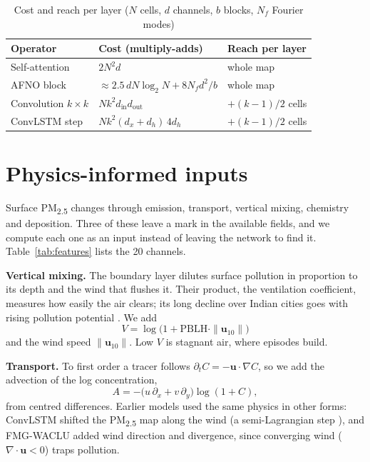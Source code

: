 \documentclass[conference]{IEEEtran}
\newcommand{\PM}{PM\textsubscript{2.5}}
\begin{document}
\begin{table}[!t]
\centering
\caption{Cost and reach per layer ($N$ cells, $d$ channels, $b$ blocks, $N_f$ Fourier modes)}
\label{tab:cost}
\setlength{\tabcolsep}{4pt}
\begin{tabular}{@{}lll@{}}
\toprule
Operator & Cost (multiply-adds) & Reach per layer \\
\midrule
Self-attention & $2N^2d$ & whole map \\
AFNO block & $\approx 2.5\,dN\log_2N + 8N_fd^2/b$ & whole map \\
Convolution $k\times k$ & $Nk^2d_{\text{in}}d_{\text{out}}$ & $+(k-1)/2$ cells \\
ConvLSTM step & $Nk^2(d_x+d_h)\,4d_h$ & $+(k-1)/2$ cells \\
\bottomrule
\end{tabular}
\end{table}

\section{Physics-informed inputs}
\label{sec:physics}
Surface \PM{} changes through emission, transport, vertical mixing, chemistry and deposition. Three of these leave a mark in the available fields, and we compute each one as an input instead of leaving the network to find it. Table~\ref{tab:features} lists the 20 channels.

\textbf{Vertical mixing.} The boundary layer dilutes surface pollution in proportion to its depth and the wind that flushes it. Their product, the ventilation coefficient, measures how easily the air clears; its long decline over Indian cities goes with rising pollution potential \cite{iyer2013}. We add
\begin{equation}
V = \log\bigl(1+\mathrm{PBLH}\cdot\|\mathbf{u}_{10}\|\bigr)
\end{equation}
and the wind speed $\|\mathbf{u}_{10}\|$. Low $V$ is stagnant air, where episodes build.

\textbf{Transport.} To first order a tracer follows $\partial_t C = -\mathbf{u}\cdot\nabla C$, so we add the advection of the log concentration,
\begin{equation}
A = -\bigl(u\,\partial_x + v\,\partial_y\bigr)\log(1+C),
\end{equation}
from centred differences. Earlier models used the same physics in other forms: ConvLSTM shifted the \PM{} map along the wind (a semi-Lagrangian step \cite{staniforth1991}), and FMG-WACLU added wind direction and divergence, since converging wind ($\nabla\cdot\mathbf{u}<0$) traps pollution.
\end{document}
